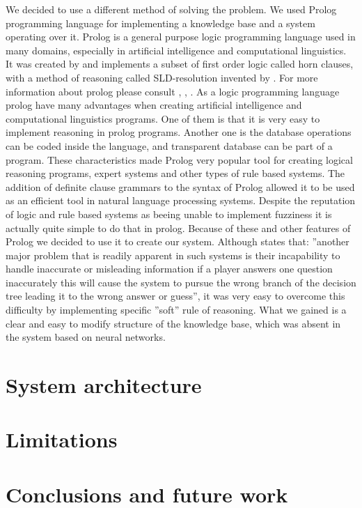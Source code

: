 \documentclass[a4paper]{article}
\begin{document}
We decided to use a different method of solving the problem. We used Prolog programming language for implementing a knowledge base and a system operating over it. Prolog is a general purpose logic programming language used in many domains, especially in artificial intelligence and computational linguistics. It was created by \citet{Prolog} and implements a subset of first order logic called horn clauses, with a method of reasoning called SLD-resolution invented by \citet{SLD}. For more information about prolog please consult \citet{Prolog1}, \citet{Prolog2}, \citet{Prolog2}. As a logic programming language prolog have many advantages when creating artificial intelligence and computational linguistics programs. One of them is that it is very easy to implement reasoning in prolog programs. Another one is the database operations can be coded inside the language, and transparent database can be part of a program. These characteristics made Prolog very popular tool for creating logical reasoning programs, expert systems and other types of rule based systems. The addition of definite clause grammars to the syntax of Prolog allowed it to be used as an efficient tool in natural language processing systems. Despite the reputation of logic and rule based systems as beeing unable to implement fuzziness it is actually quite simple to do that in prolog. Because of these and other features of Prolog we decided to use it to create our system. Although \citet{20Q} states that: ''another major problem that is readily apparent in such systems is their incapability to handle inaccurate or misleading information if a player answers one question inaccurately this will cause the system to pursue the wrong branch of the decision tree leading it to the wrong answer or guess'', it was very easy to overcome this difficulty by implementing specific ''soft'' rule of reasoning. What we gained is a clear and easy to modify structure of the knowledge base, which was absent in the system based on neural networks.
\section{System architecture}
\section{Limitations}

\section{Conclusions and future work}
\end{document}
